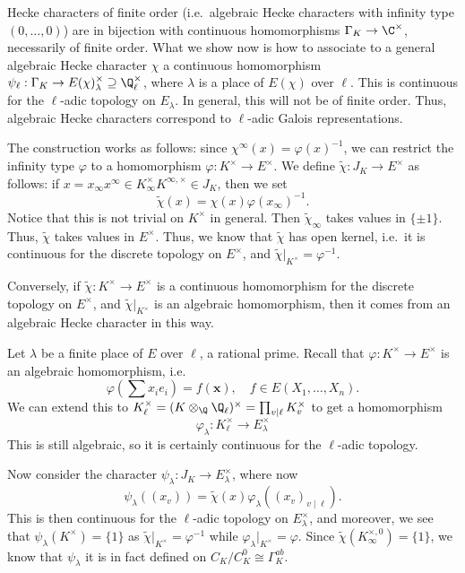 \documentclass[a4paper]{article}
\begin{document}
Hecke characters of finite order (i.e.\ algebraic Hecke characters with infinity type $(0, \ldots, 0)$) are in bijection with continuous homomorphisms $\Gamma_K \to \C^\times$, necessarily of finite order. What we show now is how to associate to a general algebraic Hecke character $\chi$ a continuous homomorphism $\psi_\ell: \Gamma_K \to E(\chi)_\lambda^\times \supseteq \Q_\ell^\times$, where $\lambda$ is a place of $E(\chi)$ over $\ell$. This is continuous for the $\ell$-adic topology on $E_\lambda$. In general, this will not be of finite order. Thus, algebraic Hecke characters correspond to $\ell$-adic Galois representations.

The construction works as follows: since $\chi^\infty(x) = \varphi(x)^{-1}$, we can restrict the infinity type $\varphi$ to a homomorphism $\varphi: K^\times \to E^\times$. We define $\tilde{\chi}: J_K \to E^\times$ as follows: if $x = x_\infty x^\infty \in K_\infty^\times K^{\infty, \times} \in J_K$, then we set
\[
  \tilde{\chi}(x) = \chi(x) \varphi(x_\infty)^{-1}.
\]
Notice that this is not trivial on $K^\times$ in general. Then $\tilde{\chi}_\infty$ takes values in $\{\pm 1\}$. Thus, $\tilde{\chi}$ takes values in $E^\times$. Thus, we know that $\tilde{\chi}$ has open kernel, i.e.\ it is continuous for the discrete topology on $E^\times$, and $\tilde{\chi}|_{K^\times} = \varphi^{-1}$.

Conversely, if $\tilde{\chi}: K^\times \to E^\times$ is a continuous homomorphism for the discrete topology on $E^\times$, and $\tilde{\chi}|_{K^\times}$ is an algebraic homomorphism, then it comes from an algebraic Hecke character in this way.

Let $\lambda$ be a finite place of $E$ over $\ell$, a rational prime. Recall that $\varphi: K^\times \to E^\times$ is an algebraic homomorphism, i.e.
\[
  \varphi\left(\sum x_i e_i\right) = f(\mathbf{x}),\quad f \in E(X_1, \ldots, X_n).
\]
We can extend this to $K_\ell^\times = (K \otimes_{\Q} \Q_\ell)^\times = \prod_{v \mid \ell} K_v^\times$ to get a homomorphism
\[
  \varphi_\lambda: K_\ell^\times \to E_\lambda^\times
\]
This is still algebraic, so it is certainly continuous for the $\ell$-adic topology.

Now consider the character $\psi_\lambda: J_K \to E_\lambda^\times$, where now
\[
  \psi_\lambda((x_v)) = \tilde{\chi}(x) \varphi_\lambda((x_v)_{v \mid \ell}).
\]
This is then continuous for the $\ell$-adic topology on $E_\lambda^\times$, and moreover, we see that $\psi_\lambda(K^\times) = \{1\}$ as $\tilde{\chi}|_{K^\times} = \varphi^{-1}$ while $\varphi_\lambda|_{K^\times} = \varphi$. Since $\tilde{\chi}(K_\infty^{\times, 0}) = \{1\}$, we know that $\psi_\lambda$ it is in fact defined on $C_K/C_K^0 \cong \Gamma_K^{ab}$.
\end{document}
